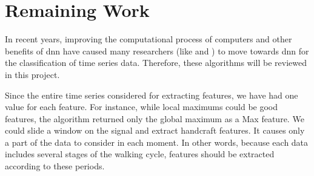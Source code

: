

%	
 

\section{Remaining Work}

In recent years, improving the computational process of computers and other benefits of \gls{dnn} have caused many researchers (like \cite{IsmailFawaz2019DeepReview} and \cite{Costilla-Reyes2018DeepSensors}) to move towards \gls{dnn} for the classification of time series data. Therefore, these algorithms will be reviewed in this project.

Since the entire time series considered for extracting features, we have had one value for each feature. For instance, while local maximums could be good features, the algorithm returned only the global maximum as a Max feature. We could slide a window on the signal and extract handcraft features. It causes only a part of the data to consider in each moment. In other words, because each data includes several stages of the walking cycle, features should be extracted according to these periods.   

